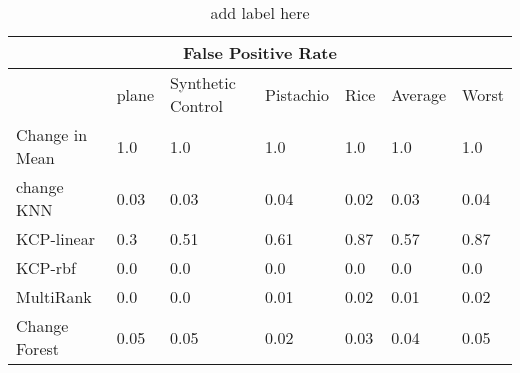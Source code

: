 
\begin{table}[!ht]
\centering
{
\begin{tabular}{ |p{2cm}|p{0.9cm}|p{0.9cm}|p{0.9cm}|p{0.9cm}|p{0.9cm}|p{0.9cm}|}
\hline
\multicolumn{7}{|c|}{False Positive Rate} \\
\hline

\hline
 & plane & Synthetic Control & Pistachio & Rice & Average & Worst  \\
\hline
\hline
Change in Mean & 1.0 & 1.0 & 1.0 & 1.0& 1.0 & 1.0 \\
change KNN & 0.03 & 0.03 & 0.04 & 0.02& 0.03 & 0.04 \\
KCP-linear & 0.3 & 0.51 & 0.61 & 0.87& 0.57 & 0.87 \\
KCP-rbf & 0.0 & 0.0 & 0.0 & 0.0& 0.0 & 0.0 \\
MultiRank & 0.0 & 0.0 & 0.01 & 0.02& 0.01 & 0.02 \\
Change Forest & 0.05 & 0.05 & 0.02 & 0.03& 0.04 & 0.05 \\
\hline
\end{tabular}}
\\
\caption{add label here}
\vspace{10pt}
\label{tab:yourlabel}
\end{table}